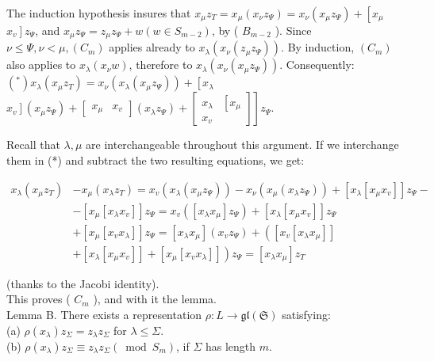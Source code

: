 \documentclass[10pt]{article}
\begin{document}
The induction hypothesis insures that $x_{\mu} z_{T}=x_{\mu}\left(x_{\nu} z_{\Psi}\right)=x_{\nu}\left(x_{\mu} z_{\Psi}\right)+\left[x_{\mu}\right.$ $\left.x_{v}\right] z_{\Psi}$, and $x_{\mu} z_{\Psi}=z_{\mu} z_{\Psi}+w\left(w \in S_{m-2}\right)$, by ( $B_{m-2}$ ). Since $\nu \leq \Psi, \nu<\mu,\left(C_{m}\right)$ applies already to $x_{\lambda}\left(x_{\nu}\left(z_{\mu} z_{\Psi}\right)\right)$. By induction, $\left(C_{m}\right)$ also applies to $x_{\lambda}\left(x_{\nu} w\right)$, therefore to $x_{\lambda}\left(x_{\nu}\left(x_{\mu} z_{\Psi}\right)\right)$. Consequently: $\left({ }^{*}\right) x_{\lambda}\left(x_{\mu} z_{T}\right)=x_{\nu}\left(x_{\lambda}\left(x_{\mu} z_{\Psi}\right)\right)+\left[x_{\lambda}\right.$ $\left.\left.x_{v}\right]\left(x_{\mu} z_{\Psi}\right)+\left[\begin{array}{ll}x_{\mu} & x_{v}\end{array}\right]\left(x_{\lambda} z_{\Psi}\right)+\left[\begin{array}{ll}x_{\lambda} & {\left[x_{\mu}\right.} \\ x_{v}\end{array}\right]\right] z_{\Psi}$.

Recall that $\lambda, \mu$ are interchangeable throughout this argument. If we interchange them in (*) and subtract the two resulting equations, we get:

$$
\begin{aligned}
x_{\lambda}\left(x_{\mu} z_{T}\right) & -x_{\mu}\left(x_{\lambda} z_{T}\right)=x_{v}\left(x_{\lambda}\left(x_{\mu} z_{\Psi}\right)\right)-x_{\nu}\left(x_{\mu}\left(x_{\lambda} z_{\Psi}\right)\right)+\left[x_{\lambda}\left[x_{\mu} x_{v}\right]\right] z_{\Psi}- \\
& -\left[x_{\mu}\left[x_{\lambda} x_{v}\right]\right] z_{\Psi}=x_{v}\left(\left[x_{\lambda} x_{\mu}\right] z_{\Psi}\right)+\left[x_{\lambda}\left[x_{\mu} x_{v}\right]\right] z_{\Psi} \\
& +\left[x_{\mu}\left[x_{v} x_{\lambda}\right]\right] z_{\Psi}=\left[x_{\lambda} x_{\mu}\right]\left(x_{v} z_{\Psi}\right)+\left(\left[x_{v}\left[x_{\lambda} x_{\mu}\right]\right]\right. \\
& \left.+\left[x_{\lambda}\left[x_{\mu} x_{v}\right]\right]+\left[x_{\mu}\left[x_{v} x_{\lambda}\right]\right]\right) z_{\Psi}=\left[x_{\lambda} x_{\mu}\right] z_{T}
\end{aligned}
$$

(thanks to the Jacobi identity).\\
This proves ( $C_{m}$ ), and with it the lemma.\\
Lemma B. There exists a representation $\rho: L \rightarrow \mathfrak{g l}(\mathfrak{S})$ satisfying:\\
(a) $\rho\left(x_{\lambda}\right) z_{\Sigma}=z_{\lambda} z_{\Sigma}$ for $\lambda \leq \Sigma$.\\
(b) $\rho\left(x_{\lambda}\right) z_{\Sigma} \equiv z_{\lambda} z_{\Sigma}\left(\bmod S_{m}\right)$, if $\Sigma$ has length $m$.
\end{document}

